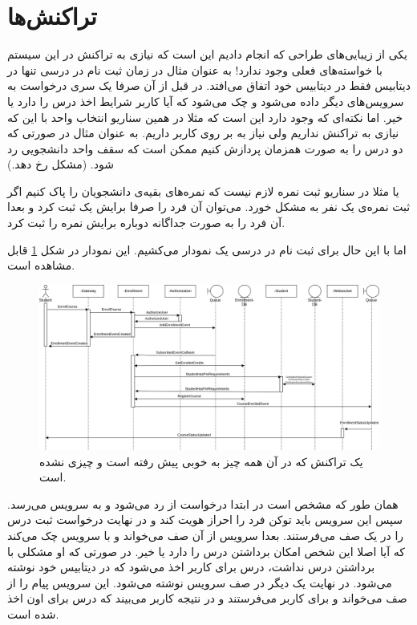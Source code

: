 \section{تراکنش‌ها}
یکی از زیبایی‌های طراحی که انجام دادیم این است که نیازی به تراکنش در این سیستم با خواسته‌های
فعلی وجود ندارد! به عنوان مثال در زمان ثبت نام در درسی تنها
در دیتابیس فقط در دیتابیس خود
اتفاق می‌افتد. در قبل از آن صرفا یک سری درخواست به سرویس‌های دیگر داده می‌شود و چک می‌شود که آیا
کاربر شرایط اخذ درس را دارد یا خیر. اما نکته‌ای که وجود دارد این است که مثلا در همین سناریو انتخاب
واحد با این که نیازی به تراکنش نداریم ولی نیاز به
بر روی کاربر داریم. به عنوان مثال در صورتی که دو درس را به صورت همزمان پردازش کنیم ممکن
است که سقف واحد دانشجویی رد شود.
(مشکل  رخ دهد.)

یا مثلا در سناریو ثبت نمره لازم نیست که نمره‌های بقیه‌ی دانشجویان را پاک کنیم اگر ثبت نمره‌ی یک نفر
به مشکل خورد. می‌توان آن فرد را صرفا برایش یک
ثبت کرد و بعدا آن فرد را به صورت جداگانه دوباره برایش نمره را ثبت کرد.

اما با این حال برای ثبت نام در درسی یک نمودار می‌کشیم.
این نمودار در شکل
\ref{transaction:good}
قابل مشاهده است.
\begin{figure}
    \centering
    \includegraphics[width=\textwidth,height=\textheight,keepaspectratio]{diagrams/Transaction-Sucess.png}
    \caption{یک تراکنش که در آن همه چیز به خوبی پیش رفته است و چیزی  نشده است.}
    \label{transaction:good}
\end{figure}
همان طور که مشخص است در ابتدا درخواست از
رد می‌شود و به سرویس
می‌رسد. سپس این سرویس باید توکن فرد را احراز هویت کند و در نهایت درخواست ثبت درس را در یک صف می‌فرستند.
بعدا سرویس
از آن صف می‌خواند و با سرویس
چک می‌کند که آیا اصلا این شخص امکان برداشتن درس را دارد یا خیر. در صورتی که او مشکلی با برداشتن درس نداشت،
درس برای کاربر اخذ می‌شود که در دیتابیس خود
نوشته می‌شود. در نهایت یک
دیگر در صف سرویس
نوشته می‌شود. این سرویس پیام را از صف می‌خواند و برای کاربر می‌فرستند و در نتیجه کاربر می‌بیند که درس برای
اون اخذ شده است.

